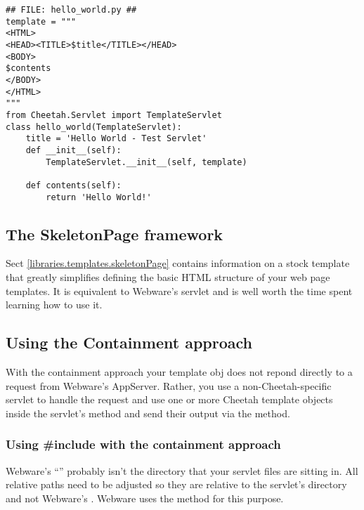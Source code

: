 \begin{verbatim}
## FILE: hello_world.py ##
template = """
<HTML>
<HEAD><TITLE>$title</TITLE></HEAD>
<BODY>
$contents
</BODY>
</HTML>
"""
from Cheetah.Servlet import TemplateServlet
class hello_world(TemplateServlet):
    title = 'Hello World - Test Servlet'
    def __init__(self):
        TemplateServlet.__init__(self, template) 

    def contents(self):
        return 'Hello World!'
\end{verbatim}


\subsection{The SkeletonPage framework}
\label{webware.skeletonPage}

Sect \ref{libraries.templates.skeletonPage} contains information on a stock
template that greatly simplifies defining the basic HTML structure of your web
page templates.  It is equivalent to Webware's  servlet and
is well worth the time spent learning how to use it.

\subsection{Using the Containment approach}
\label{webware.containment}

With the containment approach your template obj does not repond directly to a
request from Webware's AppServer. Rather, you use a non-Cheetah-specific servlet
to handle the request and use one or more Cheetah template objects inside the
servlet's  method and send their output via the 
 method.

\subsubsection{Using \#include with the containment approach}
\label{webware.containment.includes}

Webware's ``'' probably isn't the directory that
your servlet files are sitting in.  All relative paths need to be adjusted so
they are relative to the servlet's directory and not Webware's .  Webware uses the  method
for this purpose.

